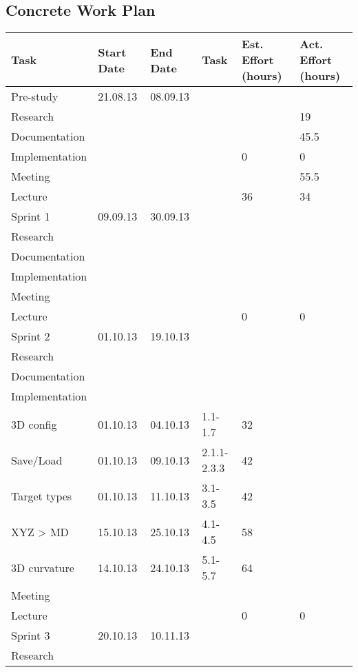 \documentclass{report}
\begin{document}
\subsection{Concrete Work Plan} \label{subsec:concrete_work_plan}
\begin{tabular}{| l | l | l | l | p{1.25 cm} | p{1.25 cm}|} \hline
Task & Start Date & End Date & Task & Est. Effort (hours) & Act. Effort (hours) \\ \hline
Pre-study & 21.08.13  & 08.09.13 &  &  &\\ \hline
Research &  &   &  &  & 19 \\ \hline
Documentation &  &   &  &  & 45.5 \\ \hline
Implementation &  &   &  &  0 & 0 \\ \hline
Meeting &  &   &  &   & 55.5 \\ \hline
Lecture &  &   &  &  36 & 34 \\ \hline
Sprint 1 & 09.09.13  & 30.09.13 &  &  &\\ \hline
Research &  &   &  &  &  \\ \hline
Documentation &  &   &  &  &  \\ \hline
Implementation &  &   &  &   &  \\ \hline
Meeting &  &   &  &   &  \\ \hline
Lecture &  &   &  &  0 & 0 \\ \hline
Sprint 2 & 01.10.13  & 19.10.13 &  &  &\\ \hline
Research &  &   &  &  &  \\ \hline
Documentation &  &   &  &  &  \\ \hline
Implementation &  &   &  &   &  \\ \hline
3D config & 01.10.13 & 04.10.13  & 1.1-1.7 & 32  &  \\ \hline
Save/Load & 01.10.13 & 09.10.13  & 2.1.1-2.3.3 & 42  &  \\ \hline
Target types & 01.10.13 & 11.10.13  & 3.1-3.5 & 42  &  \\ \hline
XYZ > MD & 15.10.13 & 25.10.13  & 4.1-4.5 & 58  &  \\ \hline
3D curvature & 14.10.13 & 24.10.13  & 5.1-5.7 & 64  &  \\ \hline
Meeting &  &   &  &   &  \\ \hline
Lecture &  &   &  &  0 & 0 \\ \hline
Sprint 3 & 20.10.13  & 10.11.13 &  &  &\\ \hline
Research &  &   &  &  &  \\ \hline

\end{tabular}
\end{document}

